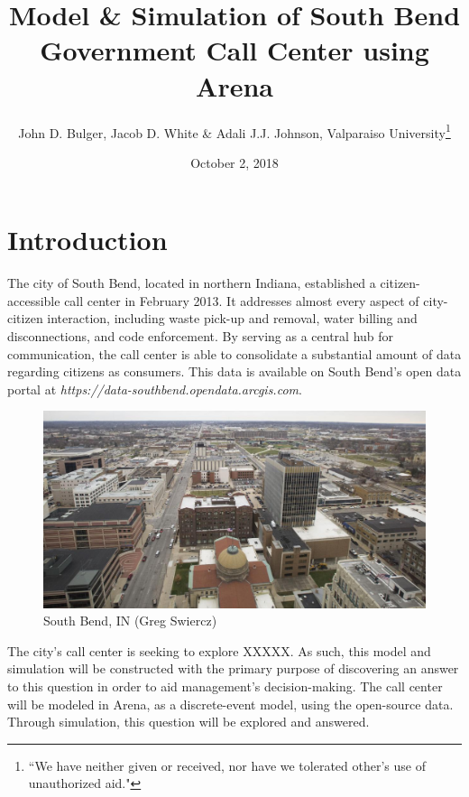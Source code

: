 \documentclass[11pt,twocolumn]{article}
\title{Model \& Simulation of South Bend Government Call Center using Arena}
\author{John D. Bulger, Jacob D. White \& Adali J.J. Johnson, Valparaiso University\thanks{``We have neither given or received, nor have we tolerated other’s use of unauthorized aid."}}
\date{October 2, 2018}
\begin{document}
\maketitle

\section{Introduction}
The city of South Bend, located in northern Indiana, established a citizen-accessible call center in February 2013.  It addresses almost every aspect of city-citizen interaction, including waste pick-up and removal, water billing and disconnections, and code enforcement.  By serving as a central hub for communication, the call center is able to consolidate a substantial amount of data regarding citizens as consumers.  This data is available on South Bend's open data portal at \textit{https://data-southbend.opendata.arcgis.com}.

\begin{figure}[h]
	\includegraphics[scale=.17]{south_bend.png}
	\caption{South Bend, IN (Greg Swiercz)}
\end{figure}

\par
The city's call center is seeking to explore XXXXX.  As such, this model and simulation will be constructed with the primary purpose of discovering an answer to this question in order to aid management's decision-making.  The call center will be modeled in Arena, as a discrete-event model, using the open-source data.  Through simulation, this question will be explored and answered.
\end{document}
